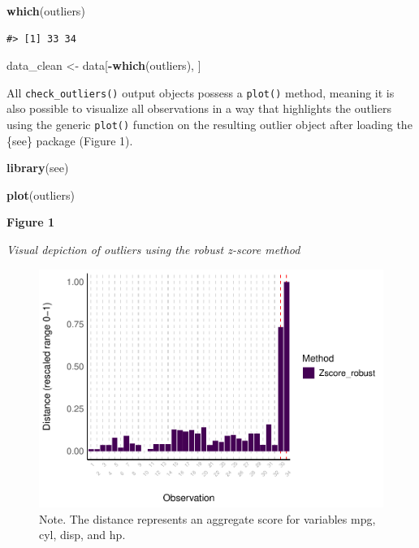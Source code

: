 \documentclass[sn-basic, lineno,pdflatex]{sn-jnl}
\newenvironment{Shaded}{\begin{snugshade}}{\end{snugshade}}
\newcommand{\FunctionTok}[1]{\textcolor[rgb]{0.13,0.29,0.53}{\textbf{#1}}}
\newcommand{\NormalTok}[1]{#1}
\newcommand{\OtherTok}[1]{\textcolor[rgb]{0.56,0.35,0.01}{#1}}
\newcommand{\SpecialCharTok}[1]{\textcolor[rgb]{0.81,0.36,0.00}{\textbf{#1}}}
\begin{document}
\begin{Shaded}
\begin{Highlighting}[]
\FunctionTok{which}\NormalTok{(outliers)}
\end{Highlighting}
\end{Shaded}

\begin{verbatim}
#> [1] 33 34
\end{verbatim}

\begin{Shaded}
\begin{Highlighting}[]
\NormalTok{data\_clean }\OtherTok{\textless{}{-}}\NormalTok{ data[}\SpecialCharTok{{-}}\FunctionTok{which}\NormalTok{(outliers), ]}
\end{Highlighting}
\end{Shaded}

All \texttt{check\_outliers()} output objects possess a \texttt{plot()}
method, meaning it is also possible to visualize all observations in a
way that highlights the outliers using the generic \texttt{plot()}
function on the resulting outlier object after loading the \{see\}
package (Figure 1).

\begin{Shaded}
\begin{Highlighting}[]
\FunctionTok{library}\NormalTok{(see)}

\FunctionTok{plot}\NormalTok{(outliers)}
\end{Highlighting}
\end{Shaded}

\textbf{Figure 1}

\emph{Visual depiction of outliers using the robust z-score method}

\begin{figure}
\includegraphics[width=1\linewidth]{paper_files/figure-latex/univariate_implicit-1} \caption{Note. The distance represents an aggregate score for variables mpg, cyl, disp, and hp.}\label{fig:univariate_implicit}
\end{figure}
\end{document}
